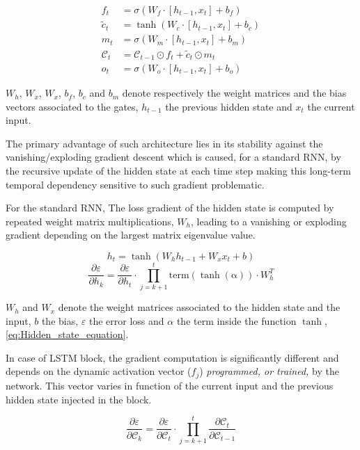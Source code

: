 \documentclass[conference]{IEEEtran}
\begin{document}
\begin{align}
    f_t &= \sigma(W_f \cdot [h_{t-1}, x_t] + b_f) \\
    \tilde{c}_t &= \tanh(W_c \cdot [h_{t-1}, x_t] + b_c) \\
    m_t &= \sigma(W_m \cdot [h_{t-1}, x_t] + b_m) \\
    \mathcal{C}_t &= \mathcal{C}_{t-1} \odot f_t + \tilde{c}_t \odot m_t\\
    o_t &= \sigma(W_o \cdot [h_{t-1}, x_t] + b_o) 
\end{align}

$W_{h}$, $W_{x}$, $W_{x}$, $b_f$, $b_c$ and $b_m$ denote respectively the weight matrices and the bias vectors associated to the gates, $h_{t-1}$ the previous hidden state and $x_{t}$ the current input.
 
The primary advantage of such architecture lies in its stability against the vanishing/exploding gradient descent which is caused, for a standard RNN, by the recursive update of the hidden state at each time step making this long-term temporal dependency sensitive to such gradient problematic.

For the standard RNN, The loss gradient of the hidden state is computed by repeated weight matrix multiplications, $W_{h}$, leading to a vanishing or exploding gradient depending on the largest matrix eigenvalue value.

\begin{equation}
    h_t = \tanh(W_{h} h_{t-1} + W_{x} x_t + b)
    \label{eq:Hidden_state_equation}
\end{equation}
\begin{equation}
    \dfrac{\partial \varepsilon}{\partial h_k} =  \dfrac{\partial \varepsilon}{\partial h_t} \cdot \prod_{j = k+1}^{t}\mathrm{term(\tanh(\alpha))}\cdot  W_{h}^T
\end{equation}

$W_{h}$ and $W_{x}$ denote the weight matrices associated to the hidden state and the input, $b$ the bias, $\varepsilon$ the error loss and $\alpha$ the term inside the function $\tanh$, \cref{eq:Hidden_state_equation}.

In case of LSTM block, the gradient computation is significantly different and depends on the dynamic activation vector ($f_j$) \textit{programmed, or trained,} by the network. This vector varies in function of the current input and the previous hidden state injected in the block.

\begin{equation}
    \dfrac{\partial \varepsilon}{\partial \mathcal{C}_k} =  \dfrac{\partial \varepsilon}{\partial \mathcal{C}_t} \cdot \prod_{j = k+1}^{t}\dfrac{\partial \mathcal{C}_t}{\partial \mathcal{C}_{t-1}}
\end{equation}
\end{document}
